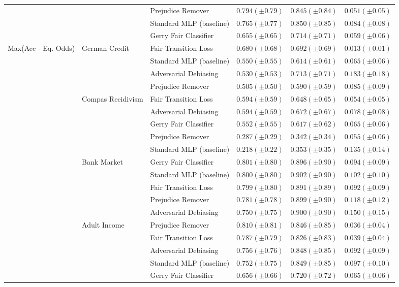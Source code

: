 \begin{tabular}{llllll}
 &  & Prejudice Remover & $0.794 (\pm0.79)$ & $0.845 (\pm0.84)$ & $0.051 (\pm0.05)$ \\
 &  & Standard MLP (baseline) & $0.765 (\pm0.77)$ & $0.850 (\pm0.85)$ & $0.084 (\pm0.08)$ \\
 &  & Gerry Fair Classifier & $0.655 (\pm0.65)$ & $0.714 (\pm0.71)$ & $0.059 (\pm0.06)$ \\
\cline{1-6} \cline{2-6}
\multirow[t]{19}{*}{Max(Acc - Eq. Odds)} & \multirow[t]{4}{*}{German Credit} & Fair Transition Loss & $0.680 (\pm0.68)$ & $0.692 (\pm0.69)$ & $0.013 (\pm0.01)$ \\
 &  & Standard MLP (baseline) & $0.550 (\pm0.55)$ & $0.614 (\pm0.61)$ & $0.065 (\pm0.06)$ \\
 &  & Adversarial Debiasing & $0.530 (\pm0.53)$ & $0.713 (\pm0.71)$ & $0.183 (\pm0.18)$ \\
 &  & Prejudice Remover & $0.505 (\pm0.50)$ & $0.590 (\pm0.59)$ & $0.085 (\pm0.09)$ \\
\cline{2-6}
 & \multirow[t]{5}{*}{Compas Recidivism} & Fair Transition Loss & $0.594 (\pm0.59)$ & $0.648 (\pm0.65)$ & $0.054 (\pm0.05)$ \\
 &  & Adversarial Debiasing & $0.594 (\pm0.59)$ & $0.672 (\pm0.67)$ & $0.078 (\pm0.08)$ \\
 &  & Gerry Fair Classifier & $0.552 (\pm0.55)$ & $0.617 (\pm0.62)$ & $0.065 (\pm0.06)$ \\
 &  & Prejudice Remover & $0.287 (\pm0.29)$ & $0.342 (\pm0.34)$ & $0.055 (\pm0.06)$ \\
 &  & Standard MLP (baseline) & $0.218 (\pm0.22)$ & $0.353 (\pm0.35)$ & $0.135 (\pm0.14)$ \\
\cline{2-6}
 & \multirow[t]{5}{*}{Bank Market} & Gerry Fair Classifier & $0.801 (\pm0.80)$ & $0.896 (\pm0.90)$ & $0.094 (\pm0.09)$ \\
 &  & Standard MLP (baseline) & $0.800 (\pm0.80)$ & $0.902 (\pm0.90)$ & $0.102 (\pm0.10)$ \\
 &  & Fair Transition Loss & $0.799 (\pm0.80)$ & $0.891 (\pm0.89)$ & $0.092 (\pm0.09)$ \\
 &  & Prejudice Remover & $0.781 (\pm0.78)$ & $0.899 (\pm0.90)$ & $0.118 (\pm0.12)$ \\
 &  & Adversarial Debiasing & $0.750 (\pm0.75)$ & $0.900 (\pm0.90)$ & $0.150 (\pm0.15)$ \\
\cline{2-6}
 & \multirow[t]{5}{*}{Adult Income} & Prejudice Remover & $0.810 (\pm0.81)$ & $0.846 (\pm0.85)$ & $0.036 (\pm0.04)$ \\
 &  & Fair Transition Loss & $0.787 (\pm0.79)$ & $0.826 (\pm0.83)$ & $0.039 (\pm0.04)$ \\
 &  & Adversarial Debiasing & $0.756 (\pm0.76)$ & $0.848 (\pm0.85)$ & $0.092 (\pm0.09)$ \\
 &  & Standard MLP (baseline) & $0.752 (\pm0.75)$ & $0.849 (\pm0.85)$ & $0.097 (\pm0.10)$ \\
 &  & Gerry Fair Classifier & $0.656 (\pm0.66)$ & $0.720 (\pm0.72)$ & $0.065 (\pm0.06)$ \\
\cline{1-6} \cline{2-6}
\bottomrule
\end{tabular}
